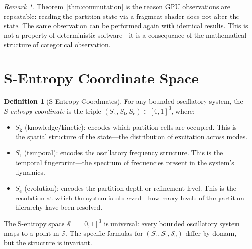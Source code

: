 \documentclass[11pt,twocolumn,a4paper]{article}
\theoremstyle{definition}
\newtheorem{definition}[theorem]{Definition}
\theoremstyle{remark}
\newtheorem{remark}[theorem]{Remark}
\newcommand{\Sk}{S_{\mathrm{k}}}
\newcommand{\St}{S_{\mathrm{t}}}
\newcommand{\Se}{S_{\mathrm{e}}}
\newcommand{\Sspace}{\mathcal{S}}
\begin{document}
\begin{remark}
Theorem~\ref{thm:commutation} is the reason GPU observations are repeatable: reading the partition state via a fragment shader does not alter the state. The same observation can be performed again with identical results. This is not a property of deterministic software---it is a consequence of the mathematical structure of categorical observation.
\end{remark}


\section{S-Entropy Coordinate Space}
\label{sec:s_entropy}

\begin{definition}[S-Entropy Coordinates]
\label{def:s_entropy}
For any bounded oscillatory system, the \emph{S-entropy coordinate} is the triple $(\Sk, \St, \Se) \in [0,1]^3$, where:
\begin{itemize}[nosep]
\item $\Sk$ (knowledge/kinetic): encodes which partition cells are occupied. This is the spatial structure of the state---the distribution of excitation across modes.
\item $\St$ (temporal): encodes the oscillatory frequency structure. This is the temporal fingerprint---the spectrum of frequencies present in the system's dynamics.
\item $\Se$ (evolution): encodes the partition depth or refinement level. This is the resolution at which the system is observed---how many levels of the partition hierarchy have been resolved.
\end{itemize}
\end{definition}

The S-entropy space $\Sspace = [0,1]^3$ is universal: every bounded oscillatory system maps to a point in $\Sspace$. The specific formulas for $(\Sk, \St, \Se)$ differ by domain, but the structure is invariant.
\end{document}
